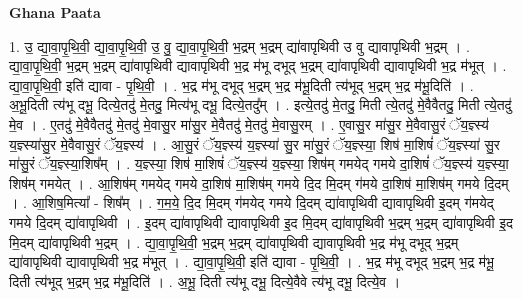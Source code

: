 \documentclass[17pt]{extarticle}
\begin{document}
\textbf{Ghana Paata } \newline

1. उ॒ द्या॒वा॒पृ॒थि॒वी॒ द्या॒वा॒पृ॒थि॒वी॒ उ॒ वु॒ द्या॒वा॒पृ॒थि॒वी॒ भ॒द्रम् भ॒द्रम् द्या॑वापृथिवी उ वु द्यावापृथिवी भ॒द्रम् । . द्या॒वा॒पृ॒थि॒वी॒ भ॒द्रम् भ॒द्रम् द्या॑वापृथिवी द्यावापृथिवी भ॒द्र म॑भू दभूद् भ॒द्रम् द्या॑वापृथिवी द्यावापृथिवी भ॒द्र म॑भूत् । . द्या॒वा॒पृ॒थि॒वी॒ इति॑ द्यावा - पृ॒थि॒वी॒ । . भ॒द्र म॑भू दभूद् भ॒द्रम् भ॒द्र म॑भू॒दिती त्य॑भूद् भ॒द्रम् भ॒द्र म॑भू॒दिति॑ । . अ॒भू॒दिती त्य॑भू दभू॒ दित्ये॒तदु॑ मे॒तदु॒ मित्य॑भू दभू॒ दित्ये॒तदु᳚म् । . इत्ये॒तदु॑ मे॒तदु॒ मिती त्ये॒तदु॑ मे॒वैवैतदु॒ मिती त्ये॒तदु॑ मे॒व । . ए॒तदु॑ मे॒वैवैतदु॑ मे॒तदु॑ मे॒वासु॒र मा॑सु॒र मे॒वैतदु॑ मे॒तदु॑ मे॒वासु॒रम् । . ए॒वासु॒र मा॑सु॒र मे॒वैवासु॒रं ॅय॒ज्ञ्स्य॑ य॒ज्ञ्स्या॑सु॒र मे॒वैवासु॒रं ॅय॒ज्ञ्स्य॑ । . आ॒सु॒रं ॅय॒ज्ञ्स्य॑ य॒ज्ञ्स्या॑ सु॒र मा॑सु॒रं ॅय॒ज्ञ्स्या॒ शिष॑ मा॒शिषं॑ ॅय॒ज्ञ्स्या॑ सु॒र मा॑सु॒रं ॅय॒ज्ञ्स्या॒शिष᳚म् । . य॒ज्ञ्स्या॒ शिष॑ मा॒शिषं॑ ॅय॒ज्ञ्स्य॑ य॒ज्ञ्स्या॒ शिष॑म् गमयेद् गमये दा॒शिषं॑ ॅय॒ज्ञ्स्य॑ य॒ज्ञ्स्या॒ शिष॑म् गमयेत् । . आ॒शिष॑म् गमयेद् गमये दा॒शिष॑ मा॒शिष॑म् गमये दि॒द मि॒दम् ग॑मये दा॒शिष॑ मा॒शिष॑म् गमये दि॒दम् । . आ॒शिष॒मित्या᳚ - शिष᳚म् । . ग॒म॒ये॒ दि॒द मि॒दम् ग॑मयेद् गमये दि॒दम् द्या॑वापृथिवी द्यावापृथिवी इ॒दम् ग॑मयेद् गमये दि॒दम् द्या॑वापृथिवी । . इ॒दम् द्या॑वापृथिवी द्यावापृथिवी इ॒द मि॒दम् द्या॑वापृथिवी भ॒द्रम् भ॒द्रम् द्या॑वापृथिवी इ॒द मि॒दम् द्या॑वापृथिवी भ॒द्रम् । . द्या॒वा॒पृ॒थि॒वी॒ भ॒द्रम् भ॒द्रम् द्या॑वापृथिवी द्यावापृथिवी भ॒द्र म॑भू दभूद् भ॒द्रम् द्या॑वापृथिवी द्यावापृथिवी भ॒द्र म॑भूत् । . द्या॒वा॒पृ॒थि॒वी॒ इति॑ द्यावा - पृ॒थि॒वी॒ । . भ॒द्र म॑भू दभूद् भ॒द्रम् भ॒द्र म॑भू॒ दिती त्य॑भूद् भ॒द्रम् भ॒द्र म॑भू॒दिति॑ । . अ॒भू॒ दिती त्य॑भू दभू॒ दित्ये॒वैवे त्य॑भू दभू॒ दित्ये॒व । \newline
\end{document}
